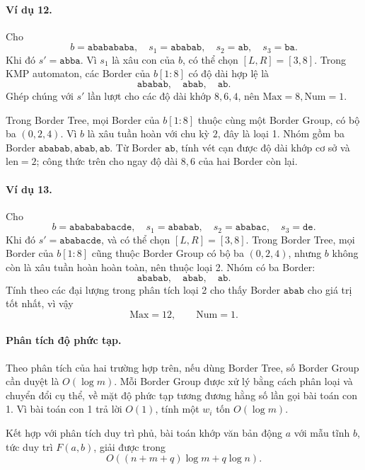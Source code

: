 \documentclass[11pt]{article}
\begin{document}
\paragraph{Ví dụ 12.}
Cho
\[
  b=\texttt{ababababa},\quad s_1=\texttt{ababab},\quad
  s_2=\texttt{ab},\quad s_3=\texttt{ba}.
\]
Khi đó \(s'=\texttt{abba}\). Vì \(s_1\) là xâu con của \(b\), có thể chọn
\([L,R]=[3,8]\). Trong KMP automaton, các Border của \(b[1:8]\) có độ dài hợp
lệ là
\[
  \texttt{ababab},\quad \texttt{abab},\quad \texttt{ab}.
\]
Ghép chúng với \(s'\) lần lượt cho các độ dài khớp \(8,6,4\), nên
\(\mathrm{Max}=8,\mathrm{Num}=1\).

Trong Border Tree, mọi Border của \(b[1:8]\) thuộc cùng một Border Group, có bộ
ba \((0,2,4)\). Vì \(b\) là xâu tuần hoàn với chu kỳ \(2\), đây là loại 1. Nhóm
gồm ba Border \(\texttt{ababab},\texttt{abab},\texttt{ab}\). Từ Border
\(\texttt{ab}\), tính vét cạn được độ dài khớp cơ sở và \(\mathrm{len}=2\);
công thức trên cho ngay độ dài \(8,6\) của hai Border còn lại.

\paragraph{Ví dụ 13.}
Cho
\[
  b=\texttt{ababababacde},\quad s_1=\texttt{ababab},\quad
  s_2=\texttt{ababac},\quad s_3=\texttt{de}.
\]
Khi đó \(s'=\texttt{ababacde}\), và có thể chọn \([L,R]=[3,8]\). Trong Border
Tree, mọi Border của \(b[1:8]\) cũng thuộc Border Group có bộ ba \((0,2,4)\),
nhưng \(b\) không còn là xâu tuần hoàn hoàn toàn, nên thuộc loại 2. Nhóm có ba
Border:
\[
  \texttt{ababab},\quad \texttt{abab},\quad \texttt{ab}.
\]
Tính theo các đại lượng trong phân tích loại 2 cho thấy Border
\(\texttt{abab}\) cho giá trị tốt nhất, vì vậy
\[
  \mathrm{Max}=12,\qquad \mathrm{Num}=1.
\]

\paragraph{Phân tích độ phức tạp.}
Theo phân tích của hai trường hợp trên, nếu dùng Border Tree, số Border Group
cần duyệt là \(O(\log m)\). Mỗi Border Group được xử lý bằng cách phân loại và
chuyển đổi cụ thể, về mặt độ phức tạp tương đương hằng số lần gọi bài toán con
1. Vì bài toán con 1 trả lời \(O(1)\), tính một \(w_i\) tốn \(O(\log m)\).

Kết hợp với phân tích duy trì phủ, bài toán khớp văn bản động \(a\) với mẫu tĩnh
\(b\), tức duy trì \(F(a,b)\), giải được trong
\[
  O((n+m+q)\log m+q\log n).
\]
\end{document}
